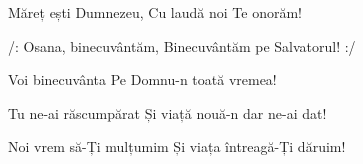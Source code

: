 \beginverse
Măreț ești Dumnezeu,
Cu laudă noi Te onorăm!
\endverse

\beginchorus
/: Osana, binecuvântăm,
Binecuvântăm pe Salvatorul! :/
\endchorus

\beginverse
Voi binecuvânta
Pe Domnu-n toată vremea!
\endverse

\beginverse
Tu ne-ai răscumpărat
Și viață nouă-n dar ne-ai dat!
\endverse

\beginverse
Noi vrem să-Ți mulțumim
Și viața întreagă-Ți dăruim!
\endverse
\endsong